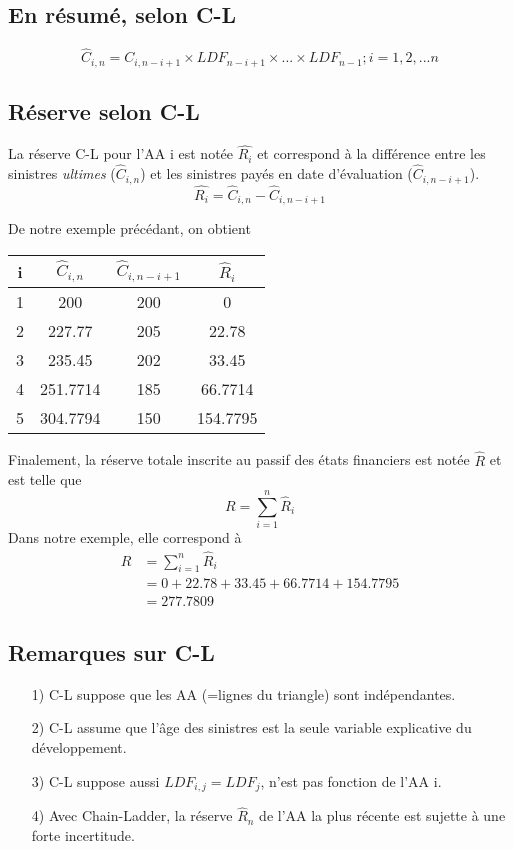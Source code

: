 \subsection*{En résumé, selon C-L}
\begin{equation}
\label{eq:CL}
\widehat{C}_{i,n} = C_{i,n-i+1} \times LDF_{n-i+1} \times ... \times LDF_{n-1}; i =1,2,...n
\end{equation}

\subsection*{Réserve selon C-L}
La réserve C-L pour l'AA i est notée $\widehat{R_i}$ et correspond à la différence entre les sinistres \textit{ultimes} ($\widehat{C}_{i,n}$) et les sinistres payés en date d'évaluation ($\widehat{C}_{i,n-i+1}$).
\begin{equation}
\widehat{R_i} = \widehat{C}_{i,n} - \widehat{C}_{i,n-i+1}
\end{equation}

De notre exemple précédant, on obtient 

\begin{center}
\begin{tabular}{|c|c|c|c|}
  \hline
   i & $ \widehat{C}_{i,n} $ & $\widehat{C}_{i,n-i+1}$ & $\widehat{R}_i$  \\
  \hline
  1 & 200 & 200 & 0 \\
  2 & 227.77 & 205 & 22.78 \\
  3 & 235.45 & 202 & 33.45 \\
  4 & 251.7714 & 185 & 66.7714 \\
  5 & 304.7794 & 150 & 154.7795 \\
  \hline
\end{tabular}
\end{center}
Finalement, la réserve totale inscrite au passif des états financiers est notée $\widehat{R}$ et est telle que
$$ R = \sum_{i=1}^{n} \widehat{R}_i $$
Dans notre exemple, elle correspond à
\begin{align*}
R &= \sum_{i=1}^{n} \widehat{R}_i \\
&= 0 + 22.78 +33.45 + 66.7714 + 154.7795 \\
&=277.7809
\end{align*}

\subsection*{Remarques sur C-L}
\begin{itemize}
\item[1)] C-L suppose que les AA (=lignes du triangle) sont indépendantes.
\item[2)] C-L assume que l'âge des sinistres est la seule variable explicative du développement.
\item[3)] C-L suppose aussi $LDF_{i,j} = LDF_j$, n'est pas fonction de l'AA i.
\item[4)] Avec Chain-Ladder, la réserve $\widehat{R}_n$ de l'AA la plus récente est sujette à une forte incertitude.
\end{itemize}

